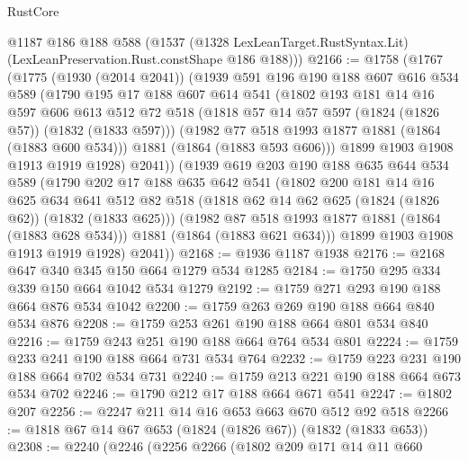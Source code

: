 \begin{lexlean}{RustCore}
\begin{coremodule}
      @1187
      @186
      @188
      @588
      (@1537 (@1328 LexLeanTarget.RustSyntax.Lit) (LexLeanPreservation.Rust.constShape @186 @188)))
@2166 := @1758
    (@1767
      (@1775
        (@1930 (@2014 @2041))
        (@1939
          @591
          @196
          @190
          @188
          @607
          @616
          @534
          @589
          (@1790
            @195
            @17
            @188
            @607
            @614
            @541
            (@1802
              @193
              @181
              @14
              @16
              @597
              @606
              @613
              @512
              @72
              @518
              (@1818 @57 @14 @57 @597 (@1824 (@1826 @57)) (@1832 (@1833 @597)))
              (@1982 @77 @518 @1993 @1877 @1881 (@1864 (@1883 @600 @534)))
              @1881
              (@1864 (@1883 @593 @606)))
            @1899
            @1903
            @1908
            @1913
            @1919
            @1928)
          @2041))
      (@1939
        @619
        @203
        @190
        @188
        @635
        @644
        @534
        @589
        (@1790
          @202
          @17
          @188
          @635
          @642
          @541
          (@1802
            @200
            @181
            @14
            @16
            @625
            @634
            @641
            @512
            @82
            @518
            (@1818 @62 @14 @62 @625 (@1824 (@1826 @62)) (@1832 (@1833 @625)))
            (@1982 @87 @518 @1993 @1877 @1881 (@1864 (@1883 @628 @534)))
            @1881
            (@1864 (@1883 @621 @634)))
          @1899
          @1903
          @1908
          @1913
          @1919
          @1928)
        @2041))
@2168 := @1936 @1187 @1938
@2176 := @2168 @647 @340 @345 @150 @664 @1279 @534 @1285
@2184 := @1750 @295 @334 @339 @150 @664 @1042 @534 @1279
@2192 := @1759 @271 @293 @190 @188 @664 @876 @534 @1042
@2200 := @1759 @263 @269 @190 @188 @664 @840 @534 @876
@2208 := @1759 @253 @261 @190 @188 @664 @801 @534 @840
@2216 := @1759 @243 @251 @190 @188 @664 @764 @534 @801
@2224 := @1759 @233 @241 @190 @188 @664 @731 @534 @764
@2232 := @1759 @223 @231 @190 @188 @664 @702 @534 @731
@2240 := @1759 @213 @221 @190 @188 @664 @673 @534 @702
@2246 := @1790 @212 @17 @188 @664 @671 @541
@2247 := @1802 @207
@2256 := @2247 @211 @14 @16 @653 @663 @670 @512 @92 @518
@2266 := @1818 @67 @14 @67 @653 (@1824 (@1826 @67)) (@1832 (@1833 @653))
@2308 := @2240
    (@2246
      (@2256
        @2266
        (@1802
          @209
          @171
          @14
          @11
          @660

\end{coremodule}
\end{lexlean}
